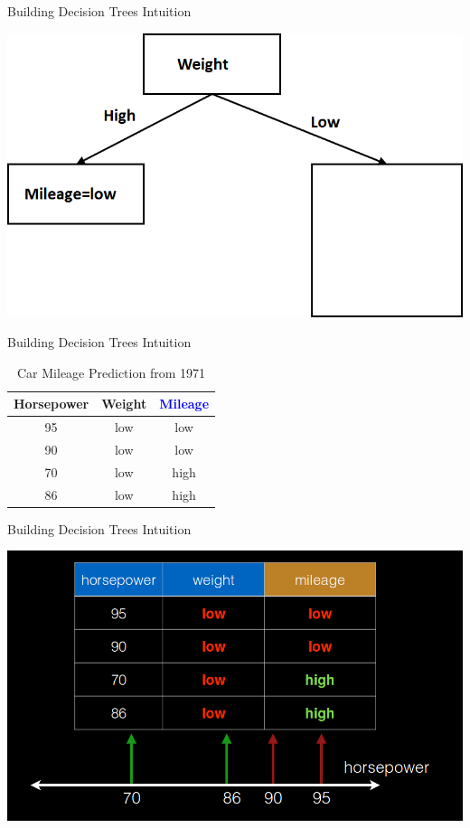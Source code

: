 \documentclass{beamer}
\begin{document}
\begin{frame}{Building Decision Trees Intuition}
    \begin{center}
        \includegraphics[scale=0.5]{dTreeEg1.png}
    \end{center}
\end{frame}
\begin{frame}{Building Decision Trees Intuition}
\begin{center}
    \begin{table}
        \begin{tabular}{| c | c | c |}
            \hline
            {\bf Horsepower} & {\bf Weight} & \textcolor{blue}{{\bf Mileage}} \\ \hline
                95 & low & low \\ \hline
                90 & low & low \\ \hline
                70 & low & high \\ \hline
                86 & low & high \\ \hline
        \end{tabular}
        \caption{Car Mileage Prediction from 1971}
    \end{table}
\end{center}
\end{frame}
\begin{frame}{Building Decision Trees Intuition}
    \begin{center}
        \includegraphics[scale=0.3]{dTreeEg2.png}
    \end{center}
\end{frame}
\end{document}
